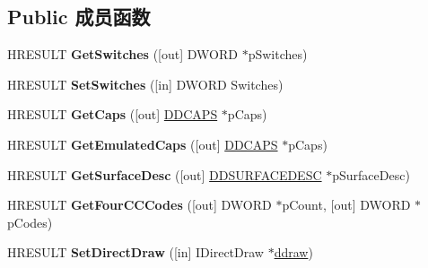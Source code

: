 \subsection*{Public 成员函数}
\begin{DoxyCompactItemize}
\item 
\mbox{\label{interface_i_direct_draw_video_a087f951910adf62889a959f7184310a1}} 
H\+R\+E\+S\+U\+LT {\bfseries Get\+Switches} (\mbox{[}out\mbox{]} D\+W\+O\+RD $\ast$p\+Switches)
\item 
\mbox{\label{interface_i_direct_draw_video_aa23955683407606c7f72aa9f009fb121}} 
H\+R\+E\+S\+U\+LT {\bfseries Set\+Switches} (\mbox{[}in\mbox{]} D\+W\+O\+RD Switches)
\item 
\mbox{\label{interface_i_direct_draw_video_aced83c228a140e48286cca3dffd3f14e}} 
H\+R\+E\+S\+U\+LT {\bfseries Get\+Caps} (\mbox{[}out\mbox{]} \hyperlink{interfacevoid}{D\+D\+C\+A\+PS} $\ast$p\+Caps)
\item 
\mbox{\label{interface_i_direct_draw_video_a0c3e5dd2f153b099cca14740ddab297e}} 
H\+R\+E\+S\+U\+LT {\bfseries Get\+Emulated\+Caps} (\mbox{[}out\mbox{]} \hyperlink{interfacevoid}{D\+D\+C\+A\+PS} $\ast$p\+Caps)
\item 
\mbox{\label{interface_i_direct_draw_video_a0226265578f99d4388fa1fb26b21bb55}} 
H\+R\+E\+S\+U\+LT {\bfseries Get\+Surface\+Desc} (\mbox{[}out\mbox{]} \hyperlink{interfacevoid}{D\+D\+S\+U\+R\+F\+A\+C\+E\+D\+E\+SC} $\ast$p\+Surface\+Desc)
\item 
\mbox{\label{interface_i_direct_draw_video_acc8b2d8026567cdf0e678d5c862879de}} 
H\+R\+E\+S\+U\+LT {\bfseries Get\+Four\+C\+C\+Codes} (\mbox{[}out\mbox{]} D\+W\+O\+RD $\ast$p\+Count, \mbox{[}out\mbox{]} D\+W\+O\+RD $\ast$p\+Codes)
\item 
\mbox{\label{interface_i_direct_draw_video_aabe154d8fcf864dee3c82482c6f25a1d}} 
H\+R\+E\+S\+U\+LT {\bfseries Set\+Direct\+Draw} (\mbox{[}in\mbox{]} I\+Direct\+Draw $\ast$\hyperlink{structddraw}{ddraw})
\item 
\mbox{\label{interface_i_direct_draw_video_ae5a4dd243e61cde8299b905ca2f5f2de}} 

\end{DoxyCompactItemize}
